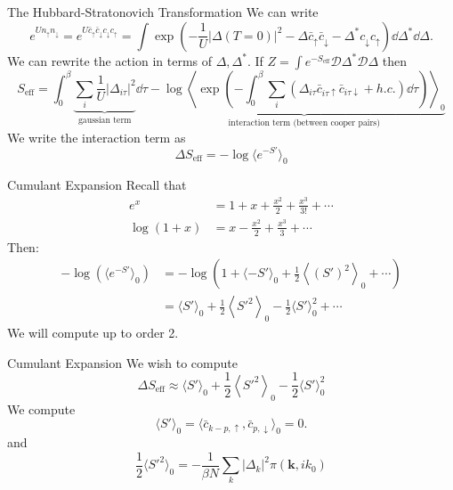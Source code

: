 \documentclass[aspectratio=169,xcolor=dvipsnames]{beamer}
\begin{document}
\begin{frame}{The Hubbard-Stratonovich Transformation}
    We can write 
    \begin{equation*}
        e^{Un_{\uparrow}n_{\downarrow}} = e^{U\bar{c}_{\uparrow}\bar{c}_{\downarrow}c_{\downarrow}c_{\uparrow}} = \int \exp\left(-\frac{1}{U}|\Delta(T=0)|^2 - \Delta \bar{c}_\uparrow \bar{c}_\downarrow - \Delta^* c_{\downarrow}c_{\uparrow} \right)\dd{\Delta^*}\dd{\Delta}.
    \end{equation*}
    We can rewrite the action in terms of $\Delta,\Delta^*.$ If $Z=\int e^{-S_\text{eff}} \mathcal{D}\Delta^* \mathcal{D}\Delta$ then
    \begin{equation*}
        S_\text{eff} = \int_0^\beta \underbrace{\sum_i \frac{1}{U}|\Delta_{i\tau}|^2}_{\text{gaussian term}} \dd{\tau} - \underbrace{\log \left\langle \exp\left(-\int_0^\beta \sum_i (\Delta_{i\tau}\bar{c}_{i\tau\uparrow}\bar{c}_{i\tau\downarrow} + h.c.) \dd{\tau}\right)\right\rangle_0}_{\text{interaction term (between cooper pairs)}}
    \end{equation*}
    We write the interaction term as 
    \begin{equation*}
        \Delta S_\text{eff} = -\log \langle e^{-S'}\rangle_0
    \end{equation*}
\end{frame}
\begin{frame}{Cumulant Expansion}
    Recall that 
    \begin{align*}
        e^x &= 1 + x + \frac{x^2}{2} + \frac{x^3}{3!} + \cdots \\ 
        \log(1+x) &= x - \frac{x^2}{2} + \frac{x^3}{3} + \cdots
    \end{align*}
    Then:
    \begin{align*}
        -\log( \langle e^{-S'} \rangle_0) &= -\log(1 + \langle {-S'}\rangle_0  + \frac{1}{2} \left\langle\left({S'}\right)^2 \right\rangle_0 + \cdots ) \\ 
        &= \langle S' \rangle_0 + \frac{1}{2} \left\langle S'^2 \right\rangle_0 - \frac{1}{2}\langle S' \rangle_0^2 + \cdots
    \end{align*}
    We will compute up to order 2.
\end{frame}
\begin{frame}{Cumulant Expansion}
    We wish to compute 
    \begin{equation*}
        \Delta S_\text{eff} \approx \langle S' \rangle_0 + \frac{1}{2} \left\langle S'^2 \right\rangle_0 - \frac{1}{2}\langle S' \rangle_0^2
    \end{equation*}
    We compute
    \begin{equation*}
        \langle S'\rangle_0 = \langle \bar{c}_{k-p,\uparrow},\bar{c}_{p,\downarrow} \rangle_0 = 0.
    \end{equation*}
    and
    \begin{equation*}
        \frac{1}{2} \langle S'^2\rangle_0 = -\frac{1}{\beta N}\sum_k |\Delta_k|^2 \pi(\bm{k},ik_0)
    \end{equation*}
\end{frame}
\end{document}
